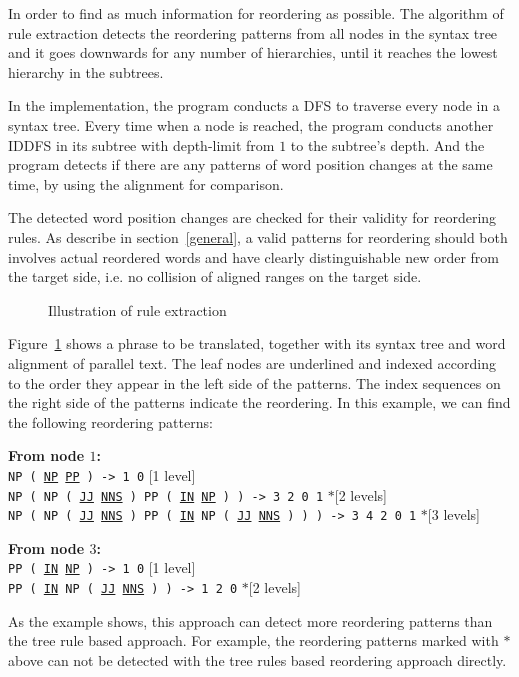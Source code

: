 In order to find as much information for reordering as possible. The algorithm of rule extraction detects the reordering patterns from all nodes in the syntax tree and it goes downwards for any number of hierarchies, until it reaches the lowest hierarchy in the subtrees.

In the implementation, the program conducts a \ac{DFS} to traverse every node in a syntax tree. Every time when a node is reached, the program conducts another \ac{IDDFS} in its subtree with depth-limit from $1$ to the subtree's depth. And the program detects if there are any patterns of word position changes at the same time, by using the alignment for comparison.

The detected word position changes are checked for their validity for reordering rules. As describe in section~\ref{general}, a valid patterns for reordering should both involves actual reordered words and have clearly distinguishable new order from the target side, i.e. no collision of aligned ranges on the target side.

\begin{figure}[H]
\centering
\scalebox{0.7}{}
\caption{Illustration of rule extraction}
\label{extract}
\end{figure}

Figure~\ref{extract} shows a phrase to be translated, together with its syntax tree and word alignment of parallel text. The leaf nodes are underlined and indexed according to the order they appear in the left side of the patterns. The index sequences on the right side of the patterns indicate the reordering. In this example, we can find the following reordering patterns:

\textbf{From node $1$:}\\
\texttt{NP ( \ul{NP} \ul{PP} ) -> 1 0} \hfill [1 level]\\
\texttt{NP ( NP ( \ul{JJ} \ul{NNS} ) PP ( \ul{IN} \ul{NP} ) ) -> 3 2 0 1} \hfill $*$[2 levels]\\
\texttt{NP ( NP ( \ul{JJ} \ul{NNS} ) PP ( \ul{IN} NP ( \ul{JJ} \ul{NNS} ) ) ) -> 3 4 2 0 1} \hfill $*$[3 levels]

\textbf{From node $3$:}\\
\texttt{PP ( \ul{IN} \ul{NP} ) -> 1 0} \hfill [1 level]\\
\texttt{PP ( \ul{IN} NP ( \ul{JJ} \ul{NNS} ) ) -> 1 2 0} \hfill $*$[2 levels]

As the example shows, this approach can detect more reordering patterns than the tree rule based approach. For example, the reordering patterns marked with $*$ above can not be detected with the tree rules based reordering approach \citep{tree} directly.

